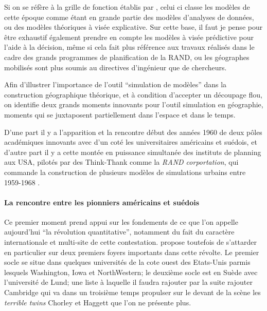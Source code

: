 Si on se réfère à la grille de fonction établis par \autocite{Varenne2014}, celui ci classe les modèles de cette époque comme étant en grande partie des modèles d'analyses de données, ou des modèles théoriques à visée explicative. Sur cette base, il faut je pense pour être exhaustif également prendre en compte les modèles à visée prédictive pour l'aide à la décision, même si cela fait plus référence aux travaux réalisés dans le cadre des grands programmes de planification de la RAND, ou les géographes mobilisés sont plus soumis au directives d'ingénieur que de chercheurs.


Afin d'illustrer l'importance de l'outil \enquote{simulation de modèles} dans la construction géographique théorique, et à condition d'accepter un découpage flou, on identifie deux grands moments innovants pour l'outil simulation en géographie, moments qui se juxtaposent partiellement dans l'espace et dans le temps.

D'une part il y a l'apparition et la rencontre début des années 1960 de deux pôles académiques innovants avec d'un coté les universitaires américains et suédois, et d'autre part il y a cette montée en puissance simultanée des instituts de planning aux USA, pilotés par des Think-Thank comme la \textit{RAND corportation}, qui commande la construction de plusieurs modèles de simulations urbains entre 1959-1968 \autocite[307]{Batty1976}. 

\paragraph{La rencontre entre les pionniers américains et suédois}

Ce premier moment prend appui sur les fondements de ce que l'on appelle aujourd'hui \enquote{la révolution quantitative}, notamment du fait du caractère internationale et multi-site de cette contestation. \textcite{Gould2004} propose toutefois de s'attarder en particulier sur deux premiers foyers importants dans cette révolte. Le premier socle se situe dans quelques universités de la cote ouest des Etats-Unis \autocite{Gould2004} parmis lesquels Washington, Iowa et NorthWestern; le deuxième socle est en Suède avec l'université de Lund; une liste à laquelle il faudra rajouter par la suite rajouter Cambridge qui va dans un troisième temps propulser sur le devant de la scène les \textit{terrible twins} Chorley et Haggett que l'on ne présente plus.

